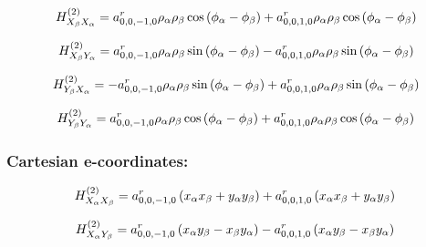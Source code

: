 \documentclass[fleqn]{article}
\begin{document}
\begin{dmath*}
H_{X_{\beta}X_{\alpha}}^{(2)}=a^{r}_{0,0,-1,0} \rho_{\alpha} \rho_{\beta} \cos{\left (\phi_{\alpha} - \phi_{\beta} \right )} + a^{r}_{0,0,1,0} \rho_{\alpha} \rho_{\beta} \cos{\left (\phi_{\alpha} - \phi_{\beta} \right )}\\
\end{dmath*}

\begin{dmath*}
H_{X_{\beta}Y_{\alpha}}^{(2)}= a^{r}_{0,0,-1,0} \rho_{\alpha} \rho_{\beta} \sin{\left (\phi_{\alpha} - \phi_{\beta} \right )} -  a^{r}_{0,0,1,0} \rho_{\alpha} \rho_{\beta} \sin{\left (\phi_{\alpha} - \phi_{\beta} \right )}\\
\end{dmath*}

\begin{dmath*}
H_{Y_{\beta}X_{\alpha}}^{(2)}=-  a^{r}_{0,0,-1,0} \rho_{\alpha} \rho_{\beta} \sin{\left (\phi_{\alpha} - \phi_{\beta} \right )} +  a^{r}_{0,0,1,0} \rho_{\alpha} \rho_{\beta} \sin{\left (\phi_{\alpha} - \phi_{\beta} \right )}\\
\end{dmath*}

\begin{dmath*}
H_{Y_{\beta}Y_{\alpha}}^{(2)}= a^{r}_{0,0,-1,0} \rho_{\alpha} \rho_{\beta} \cos{\left (\phi_{\alpha} - \phi_{\beta} \right )} +  a^{r}_{0,0,1,0} \rho_{\alpha} \rho_{\beta} \cos{\left (\phi_{\alpha} - \phi_{\beta} \right )}\\
\end{dmath*}
\subsubsection*{Cartesian e-coordinates:}

\begin{dmath*}
H_{X_{\alpha}X_{\beta}}^{(2)}=a^{r}_{0,0,-1,0} \left(x_{\alpha} x_{\beta} + y_{\alpha} y_{\beta}\right) + a^{r}_{0,0,1,0} \left(x_{\alpha} x_{\beta} + y_{\alpha} y_{\beta}\right)\\
\end{dmath*}

\begin{dmath*}
H_{X_{\alpha}Y_{\beta}}^{(2)}= a^{r}_{0,0,-1,0} \left(x_{\alpha} y_{\beta} - x_{\beta} y_{\alpha}\right) -  a^{r}_{0,0,1,0} \left(x_{\alpha} y_{\beta} - x_{\beta} y_{\alpha}\right)\\
\end{dmath*}
\end{document}
